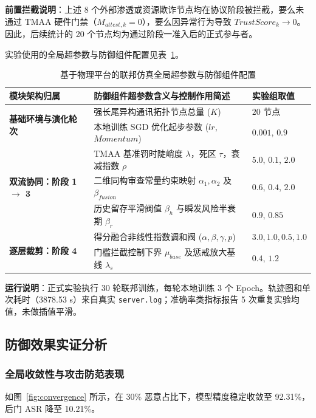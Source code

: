 \documentclass[11pt, a4paper, UTF8, fontset=fandol]{ctexart}
\begin{document}
\textbf{前置拦截说明}：上述 8 个外部渗透或资源欺诈节点均在协议阶段被拦截，要么未通过 TMAA 硬件门禁（$M_{attest,k}=0$），要么因异常行为导致 $TrustScore_k \to 0$。因此，后续统计的 20 个节点均为通过阶段一准入后的正式参与者。

实验使用的全局超参数与防御组件配置见表~\ref{tab:hyperparams}。

\begin{table}[htbp]
\centering
\caption{基于物理平台的联邦仿真全局超参数与防御组件配置}
\label{tab:hyperparams}
\begin{tabular}{p{4cm} p{8.5cm} p{2cm}}
\toprule
\textbf{模块架构归属} & \textbf{防御组件超参数含义与控制作用简述} & \textbf{实验组取值} \\
\midrule
\multirow{2}{*}{\textbf{基础环境与演化轮次}} & 强长尾异构通讯拓扑节点总量 ($K$) & $20$ 节点 \\
& 本地训练 SGD 优化起步参数 ($lr$, $Momentum$) & $0.001$, $0.9$ \\
\midrule
\multirow{3}{*}{\textbf{双流协同：阶段 1 $\to$ 3}} & TMAA 基准罚时陡峭度 $\lambda$，死区 $\tau$，衰减指数 $\rho$ & $5.0$, $0.1$, $2.0$ \\
& 二维同构审查常量约束映射 $\alpha_1, \alpha_2$ 及 $\beta_{fusion}$ & $0.6$, $0.4$, $2.0$ \\
& 历史留存平滑阀值 $\beta_h$ 与瞬发风险半衰期 $\beta_r$ & $0.9$, $0.85$ \\
\midrule
\multirow{2}{*}{\textbf{逐层裁剪：阶段 4}} & 得分融合非线性指数调和阀 ($\alpha, \beta, \gamma, p$) & $3.0, 1.0, 0.5, 1.0$ \\
& 门槛拦截控制下界 $\mu_{base}$ 及惩戒放大基线 $\lambda_s$  & $0.4$, $1.2$ \\
\bottomrule
\end{tabular}
\end{table}

\textbf{运行说明}：正式实验执行 30 轮联邦训练，每轮本地训练 3 个 Epoch。轨迹图和单次耗时（3878.53 s）来自真实 \texttt{server.log}；准确率类指标报告 5 次重复实验均值，未做插值平滑。

\subsection{防御效果实证分析}

\subsubsection{全局收敛性与攻击防范表现}
如图~\ref{fig:convergence} 所示，在 30\% 恶意占比下，模型精度稳定收敛至 92.31\%，后门 ASR 降至 10.21\%。
\end{document}
